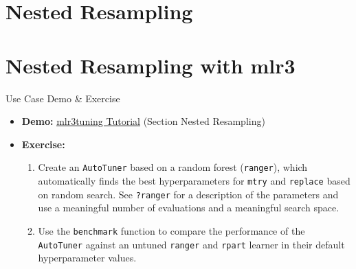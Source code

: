 \documentclass[11pt,compress]{beamer}
\begin{document}
\section{Nested Resampling}







\section{Nested Resampling with mlr3}

\begin{frame}{Use Case Demo \& Exercise}
\begin{itemize}
\item \textbf{Demo:} \href{https://mlr3gallery.mlr-org.com/posts/2020-03-11-mlr3tuning-tutorial-german-credit/\#nested-resampling}{\underline{mlr3tuning Tutorial}} (Section Nested Resampling)
\item \textbf{Exercise:}
\begin{enumerate}
\item Create an \texttt{AutoTuner} based on a random forest (\texttt{ranger}), which automatically finds the best hyperparameters for \texttt{mtry} and \texttt{replace} based on random search.
See \texttt{?ranger} for a description of the parameters and use a meaningful number of evaluations and a meaningful search space.
\item Use the \texttt{benchmark} function to compare the performance of the \texttt{AutoTuner} against an untuned \texttt{ranger} and \texttt{rpart} learner in their default hyperparameter values.
\end{enumerate}
\end{itemize}
\end{frame}
\end{document}
